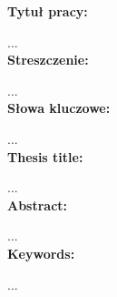 {\bfseries Tytuł pracy:}

...
\\

{\bfseries Streszczenie:}

...
\\

{\bfseries Słowa kluczowe:}

...
\\

{\bfseries Thesis title:}

...
\\

{\bfseries Abstract:}

...
\\

{\bfseries Keywords:}

...
